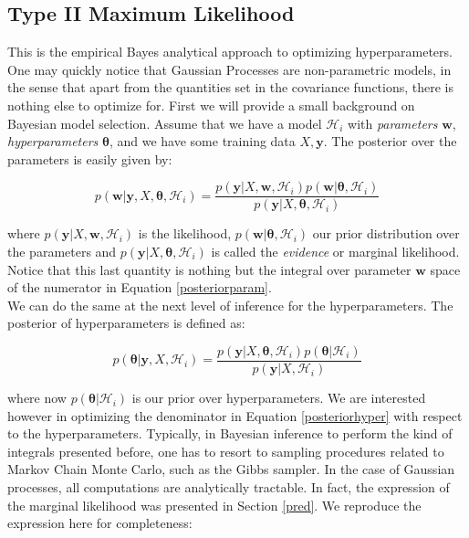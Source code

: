 \documentclass[10pt,a4paper,twoside]{book}
\begin{document}
\subsection{Type II Maximum Likelihood}
\label{empbayes}

This is the empirical Bayes \cite{Rossi2006} analytical approach to optimizing hyperparameters. One may quickly notice that Gaussian Processes are non-parametric models, in the sense that apart from the quantities set in the covariance functions, there is nothing else to optimize for. First we will provide a small background on Bayesian model selection. Assume that we have a model  $\mathcal{H}_i$ with \textit{parameters} $\boldsymbol{w}$, \textit{hyperparameters} $\boldsymbol{\theta}$, and we have some training data $X, \boldsymbol{y}$. The posterior over the parameters is easily given by:

\begin{equation}
\label{posteriorparam}
p(\boldsymbol{w}|\boldsymbol{y}, X, \boldsymbol{\theta}, \mathcal{H}_i) = \dfrac{p(\boldsymbol{y}|X, \boldsymbol{w}, \mathcal{H}_i)p(\boldsymbol{w}|\boldsymbol{\theta}, \mathcal{H}_i)}{p(\boldsymbol{y}|X, \boldsymbol{\theta}, \mathcal{H}_i)}
\end{equation}

where $p(\boldsymbol{y}|X, \boldsymbol{w}, \mathcal{H}_i)$ is the likelihood, $p(\boldsymbol{w}|\boldsymbol{\theta}, \mathcal{H}_i)$ our prior distribution over the parameters and $p(\boldsymbol{y}|X, \boldsymbol{\theta}, \mathcal{H}_i)$ is called the \textit{evidence} or marginal likelihood. Notice that this last quantity is nothing but the integral over parameter $\boldsymbol{w}$ space of the numerator in Equation \ref{posteriorparam}.\\

We can do the same at the next level of inference for the hyperparameters. The posterior of hyperparameters is defined as:

\begin{equation}
\label{posteriorhyper}
p(\boldsymbol{\theta}|\boldsymbol{y}, X, \mathcal{H}_i) = \dfrac{p(\boldsymbol{y}|X, \boldsymbol{\theta}, \mathcal{H}_i)p(\boldsymbol{\theta}|\mathcal{H}_i)}{p(\boldsymbol{y}|X, \mathcal{H}_i)}
\end{equation}

where now $p(\boldsymbol{\theta}|\mathcal{H}_i)$ is our prior over hyperparameters. We are interested however in optimizing the denominator in Equation \ref{posteriorhyper} with respect to the hyperparameters. Typically, in Bayesian inference to perform the kind of integrals presented before, one has to resort to sampling procedures related to Markov Chain Monte Carlo, such as the Gibbs sampler. In the case of Gaussian processes, all computations are analytically tractable. In fact, the expression of the marginal likelihood was presented in Section \ref{pred}. We reproduce the expression here for completeness:
\end{document}
